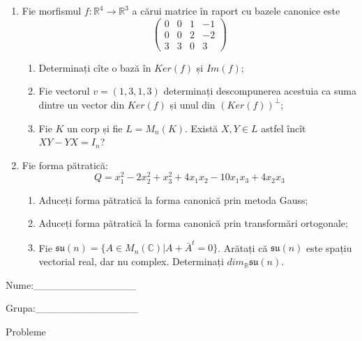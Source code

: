 \documentclass{article}
\begin{document}
\begin{enumerate}
 \item Fie morfismul $f:\mathbb{R}^4 \to \mathbb{R}^3$ a cărui matrice în raport cu bazele canonice este
$$\begin{pmatrix}
0&0&1&-1\\
0&0&2&-2\\
3&3&0&3
\end{pmatrix}$$

\begin{enumerate}
\item Determinați cîte o bază în $Ker(f)$ și $Im(f)$;
\item Fie vectorul $v=(1,3,1,3)$ determinați descompunerea acestuia ca suma dintre un vector din $Ker(f)$ și unul din $(Ker(f))^\perp$;
\item Fie $K$ un corp și fie $L=M_n(K)$. Există $X,Y \in L$ astfel încît $XY-YX=I_n$?  
\end{enumerate}
\item Fie forma pătratică:
$$Q= x_1^2-2x_2^2+x_3^2+4x_1x_2-10x_1x_3+4x_2x_3$$

\begin{enumerate}
\item Aduceți forma pătratică la forma canonică prin metoda Gauss;
\item Aduceți forma pătratică la forma canonică prin transformări ortogonale;
\item Fie $\mathfrak{su}(n)=\{ A \in M_n(\mathbb{C}) | A+\bar{A}^t=0\}$. Arătați că $\mathfrak{su}(n)$ este spațiu vectorial real, dar nu complex.
Determinați $dim_{\mathbb{R}}\mathfrak{su}(n)$.
\end{enumerate}
\end{enumerate}
\newpage
\begin{flushright}
Nume:\_\_\_\_\_\_\_\_\_\_\_\_\_\_
 
 
Grupa:\_\_\_\_\_\_\_\_\_\_\_\_\_\_
\end{flushright}
\begin{center}
\vspace{2cm}
{\Large Probleme}
\vspace{2cm}
\end{center}
\end{document}
